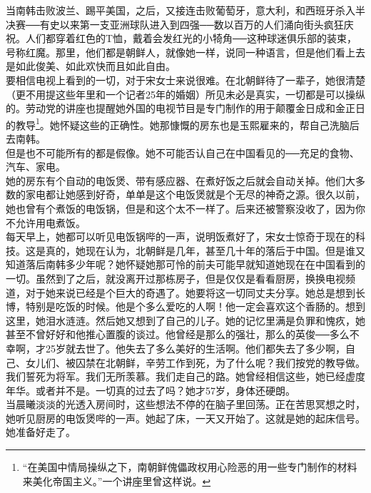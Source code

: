 当南韩击败波兰、踢平美国，之后，又接连击败葡萄牙，意大利，和西班牙杀入半决赛──有史以来第一支亚洲球队进入到四强──数以百万的人们涌向街头疯狂庆祝。人们都穿着红色的T恤，戴着会发红光的小犄角──这种球迷俱乐部的装束，号称红魔。那里，他们都是朝鲜人，就像她一样，说同一种语言，但是他们看上去是如此俊美、如此欢快而且如此自由。\\

要相信电视上看到的一切，对于宋女士来说很难。在北朝鲜待了一辈子，她很清楚（更不用提这些年里和一个记者25年的婚姻）所见未必是真实，一切都是可以操纵的。劳动党的讲座也提醒她外国的电视节目是专门制作的用于颠覆金日成和金正日的教导\footnote{“在美国中情局操纵之下，南朝鲜傀儡政权用心险恶的用一些专门制作的材料来美化帝国主义。”一个讲座里曾这样说。}。她怀疑这些的正确性。她那慷慨的房东也是玉熙雇来的，帮自己洗脑后去南韩。\\

但是也不可能所有的都是假像。她不可能否认自己在中国看见的──充足的食物、汽车、家电。\\

她的房东有个自动的电饭煲、带有感应器、在煮好饭之后就会自动关掉。他们大多数的家电都让她感到好奇，单单是这个电饭煲就是个无尽的神奇之源。很久以前，她也曾有个煮饭的电饭锅，但是和这个太不一样了。后来还被警察没收了，因为你不允许用电煮饭。\\

每天早上，她都可以听见电饭锅哔的一声，说明饭煮好了，宋女士惊奇于现在的科技。这是真的，她现在认为，北朝鲜是几年，甚至几十年的落后于中国。但是谁又知道落后南韩多少年呢？她怀疑她那可怜的前夫可能早就知道她现在在中国看到的一切。虽然到了之后，就没离开过那栋房子，但是仅仅是看看厨房，换换电视频道，对于她来说已经是个巨大的奇遇了。她要将这一切同丈夫分享。她总是想到长博，特别是吃饭的时候。他是个多么爱吃的人啊！他一定会喜欢这个香肠的。想到这里，她泪水涟涟。然后她又想到了自己的儿子。她的记忆里满是负罪和愧疚，她甚至不曾好好和他推心置腹的谈过。他曾经是那么的强壮，那么的英俊──多么不幸啊，才25岁就去世了。他失去了多么美好的生活啊。他们都失去了多少啊，自己、女儿们、被囚禁在北朝鲜，辛劳工作到死，为了什么呢？我们按党的教导做。我们誓死为将军。我们无所羡慕。我们走自己的路。她曾经相信这些，她已经虚度年华。或者并不是。一切真的过去了吗？她才57岁，身体还硬朗。\\

当晨曦淡淡的光透入房间时，这些想法不停的在脑子里回荡。正在苦思冥想之时，她听见厨房的电饭煲哔的一声。她起了床，一天又开始了。这就是她的起床信号。她准备好走了。\\
